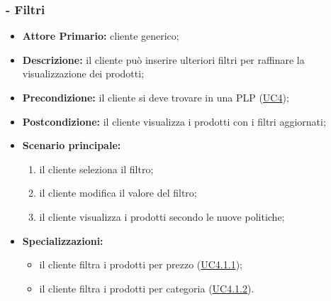 \stepsubUserCase
\subsubsection{ - Filtri}
\begin{itemize}
    \item \textbf{Attore Primario:} cliente generico;
    \item \textbf{Descrizione:} il cliente può inserire ulteriori filtri per raffinare la visualizzazione dei prodotti;
    \item \textbf{Precondizione:} il cliente si deve trovare in una PLP (\hyperref[UC4]{UC4});
    \item \textbf{Postcondizione:} il cliente visualizza i prodotti con i filtri aggiornati;
    \item \textbf{Scenario principale:}
    \begin{enumerate}
        \item il cliente seleziona il filtro;
        \item il cliente modifica il valore del filtro;
        \item il cliente visualizza i prodotti secondo le nuove politiche; 
    \end{enumerate}
    \item \textbf{Specializzazioni: }
    \begin{itemize}
        \item il cliente filtra i prodotti per prezzo (\hyperref[UC4.1.1]{UC4.1.1});
        \item il cliente filtra i prodotti per categoria (\hyperref[UC4.1.2]{UC4.1.2}).
    \end{itemize}
\end{itemize}

\stepsubsubUserCase
